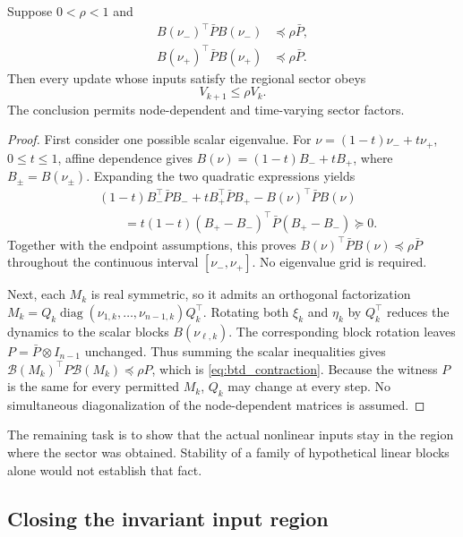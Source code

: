 \begin{btdlemma}
\label{lem:btd_endpoint}
Suppose $0<\rho<1$ and
\begin{align}
 B(\nu_-)^\top\bar P B(\nu_-)&\preceq\rho\bar P,\nonumber\\
 B(\nu_+)^\top\bar P B(\nu_+)&\preceq\rho\bar P.
 \label{eq:btd_d_endpoints}
\end{align}
Then every update whose inputs satisfy the regional sector obeys
\begin{equation}
 V_{k+1}\le\rho V_k.
 \label{eq:btd_contraction}
\end{equation}
The conclusion permits node-dependent and time-varying sector factors.
\end{btdlemma}
\begin{proof}
First consider one possible scalar eigenvalue. For
$\nu=(1-t)\nu_-+t\nu_+$, $0\le t\le1$, affine dependence gives
$B(\nu)=(1-t)B_-+tB_+$, where $B_\pm=B(\nu_\pm)$.
Expanding the two quadratic expressions yields
\begin{align}
 &(1-t)B_-^\top\bar P B_-+tB_+^\top\bar P B_+
       -B(\nu)^\top\bar P B(\nu)\nonumber\\
 &\qquad=t(1-t)(B_+-B_-)^\top\bar P(B_+-B_-)\succeq0.
 \label{eq:btd_d_convexity}
\end{align}
Together with the endpoint assumptions, this proves
$B(\nu)^\top\bar P B(\nu)\preceq\rho\bar P$ throughout the
continuous interval $[\nu_-,\nu_+]$. No eigenvalue grid is required.

Next, each $M_k$ is real symmetric, so it admits an orthogonal
factorization $M_k=Q_k\operatorname{diag}(\nu_{1,k},\ldots,
\nu_{n-1,k})Q_k^\top$. Rotating both $\xi_k$ and $\eta_k$ by $Q_k^\top$
reduces the dynamics to the scalar blocks $B(\nu_{\ell,k})$.
The corresponding block rotation leaves $P=\bar P\otimes I_{n-1}$
unchanged. Thus summing the scalar inequalities gives
$\mathcal B(M_k)^\top P\mathcal B(M_k)\preceq\rho P$, which is
\eqref{eq:btd_contraction}. Because the witness $P$ is the same for
every permitted $M_k$, $Q_k$ may change at every step. No simultaneous
diagonalization of the node-dependent matrices is assumed.
\end{proof}

The remaining task is to show that the actual nonlinear inputs stay in
the region where the sector was obtained. Stability of a family of
hypothetical linear blocks alone would not establish that fact.

\subsection{Closing the invariant input region}


